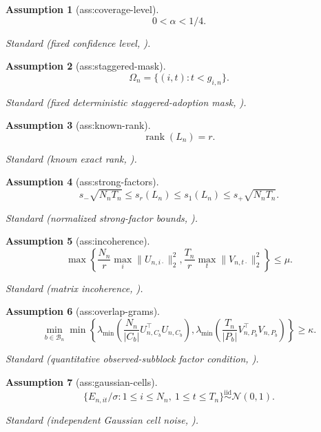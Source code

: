 \documentclass{article}
\newtheorem{assumption}{Assumption}
\begin{document}
\begin{assumption}[ass:coverage-level]\label{ass:coverage-level}
\[0<\alpha<1/4.\]
\par\smallskip\noindent\emph{Standard} (fixed confidence level, \cite{CarpentierNickl2015}).
\end{assumption}

\begin{assumption}[ass:staggered-mask]\label{ass:staggered-mask}
\[\Omega_n=\{(i,t):t<g_{i,n}\}.\]
\par\smallskip\noindent\emph{Standard} (fixed deterministic staggered-adoption mask, \cite{YanWainwright2024}).
\end{assumption}

\begin{assumption}[ass:known-rank]\label{ass:known-rank}
\[\operatorname{rank}(L_n)=r.\]
\par\smallskip\noindent\emph{Standard} (known exact rank, \cite{YanWainwright2024}).
\end{assumption}

\begin{assumption}[ass:strong-factors]\label{ass:strong-factors}
\[s_-\sqrt{N_nT_n}\le s_r(L_n)\le s_1(L_n)\le s_+\sqrt{N_nT_n}.\]
\par\smallskip\noindent\emph{Standard} (normalized strong-factor bounds, \cite{BaiNg2021}).
\end{assumption}

\begin{assumption}[ass:incoherence]\label{ass:incoherence}
\[\max\left\{\frac{N_n}{r}\max_i\lVert U_{n,i\cdot}\rVert_2^2,\frac{T_n}{r}\max_t\lVert V_{n,t\cdot}\rVert_2^2\right\}\le\mu.\]
\par\smallskip\noindent\emph{Standard} (matrix incoherence, \cite{ChenFanMaYan2019}).
\end{assumption}

\begin{assumption}[ass:overlap-grams]\label{ass:overlap-grams}
\[\min_{b\in\mathcal B_n}\min\left\{\lambda_{\min}\!\left(\frac{N_n}{|C_b|}U_{n,C_b}^{\top}U_{n,C_b}\right),\lambda_{\min}\!\left(\frac{T_n}{|P_b|}V_{n,P_b}^{\top}V_{n,P_b}\right)\right\}\ge\kappa.\]
\par\smallskip\noindent\emph{Standard} (quantitative observed-subblock factor condition, \cite{YanWainwright2024}).
\end{assumption}

\begin{assumption}[ass:gaussian-cells]\label{ass:gaussian-cells}
\[\{E_{n,it}/\sigma:1\le i\le N_n,\ 1\le t\le T_n\}\overset{\mathrm{iid}}{\sim}\mathcal N(0,1).\]
\par\smallskip\noindent\emph{Standard} (independent Gaussian cell noise, \cite{YanWainwright2024}).
\end{assumption}
\end{document}
